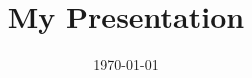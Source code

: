 \documentclass[11pt]{beamer}
\begin{document}
\title{My Presentation}
\author{}
\date{\today}
\begin{frame}
\titlepage
\label{title-frame}
\end{frame}
\end{document}
